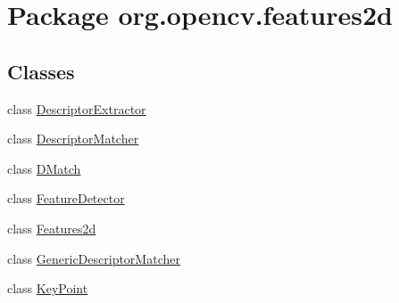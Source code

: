 \hypertarget{namespaceorg_1_1opencv_1_1features2d}{}\section{Package org.\+opencv.\+features2d}
\label{namespaceorg_1_1opencv_1_1features2d}
\subsection*{Classes}
\begin{DoxyCompactItemize}
\item 
class \mbox{\hyperlink{classorg_1_1opencv_1_1features2d_1_1_descriptor_extractor}{Descriptor\+Extractor}}
\item 
class \mbox{\hyperlink{classorg_1_1opencv_1_1features2d_1_1_descriptor_matcher}{Descriptor\+Matcher}}
\item 
class \mbox{\hyperlink{classorg_1_1opencv_1_1features2d_1_1_d_match}{D\+Match}}
\item 
class \mbox{\hyperlink{classorg_1_1opencv_1_1features2d_1_1_feature_detector}{Feature\+Detector}}
\item 
class \mbox{\hyperlink{classorg_1_1opencv_1_1features2d_1_1_features2d}{Features2d}}
\item 
class \mbox{\hyperlink{classorg_1_1opencv_1_1features2d_1_1_generic_descriptor_matcher}{Generic\+Descriptor\+Matcher}}
\item 
class \mbox{\hyperlink{classorg_1_1opencv_1_1features2d_1_1_key_point}{Key\+Point}}
\end{DoxyCompactItemize}
